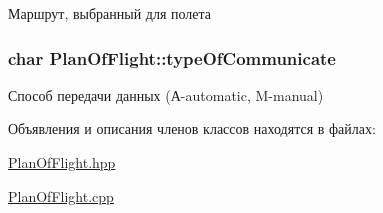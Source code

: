 Маршрут, выбранный для полета 

\subsubsection[{\texorpdfstring{type\+Of\+Communicate}{typeOfCommunicate}}]{\setlength{\rightskip}{0pt plus 5cm}char Plan\+Of\+Flight\+::type\+Of\+Communicate\hspace{0.3cm}{\ttfamily [private]}}\hypertarget{class_plan_of_flight_a69bff58fe114fa0968023a827e7aeb9c}{}\label{class_plan_of_flight_a69bff58fe114fa0968023a827e7aeb9c}


Способ передачи данных (А-\/automatic, M-\/manual) 



Объявления и описания членов классов находятся в файлах\+:\begin{DoxyCompactItemize}
\item 
\hyperlink{_plan_of_flight_8hpp}{Plan\+Of\+Flight.\+hpp}\item 
\hyperlink{_plan_of_flight_8cpp}{Plan\+Of\+Flight.\+cpp}\end{DoxyCompactItemize}
